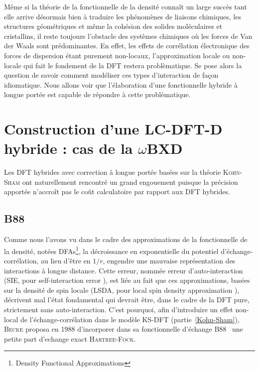 {{Même si la théorie de la fonctionnelle de la densité connaît un large succès tant elle arrive désormais bien à traduire les phénomènes de liaisons chimiques, les structures géométriques et même la cohésion des solides moléculaires et cristallins, il reste toujours l'obstacle des systèmes chimiques où les forces de Van der Waals sont prédominantes. En effet, les effets de corrélation électronique des forces de dispersion étant purement non-locaux, l'approximation locale ou non-locale qui fait le fondement de la DFT restera problèmatique. Se pose alors la question de savoir comment modéliser ces types d'interaction de façon idiomatique. Nous allons voir que l'élaboration d'une fonctionnelle hybride à longue portée est capable de répondre à cette problèmatique.

\section[LC-DFT-D hybride : $\omega$BXD]{Construction d'une LC-DFT-D hybride : cas de la $\omega$BXD}

Les DFT hybrides avec correction à longue portée basées sur la théorie \textsc{Kohn-Sham} ont naturellement rencontré un grand engouement puisque la précision apportée n'accroît pas le coût calculatoire par rapport aux DFT hybrides.

\subsection{B88}

Comme nous l'avons vu dans le cadre des approximations de la fonctionnelle de la densité, notées DFAs\footnote{\og Density Functional Approximations \fg{} }, la décroissance en exponentielle du potentiel d'échange-corrélation, au lieu d'être en $1/r$, engendre une mauvaise représentation des interactions à longue distance. Cette erreur, nommée erreur d'auto-interaction (SIE, pour \og self-interaction error \fg{}), est liée au fait que ces approximations, basées sur la densité de spin locale (LSDA, pour \og local spin density approximation \fg{}), décrivent mal l'état fondamental qui devrait être, dans le cadre de la DFT pure, strictement sans auto-interaction.     
C'est pourquoi, afin d'introduire un effet non-local de l'échange-corrélation dans le modèle KS-DFT (partie~\ref{Kohn-Sham}), \textsc{Becke} proposa en 1988 d'incorporer dans sa fonctionnelle d'échange B88~\cite{becke1988density} une petite part d'echange exact \textsc{Hartree-Fock}. 

}}
